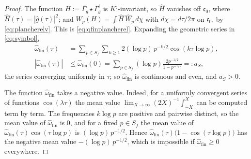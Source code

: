 \documentclass[11pt]{amsart}
\theoremstyle{definition}
\newcommand{\Knat}{K^{\natural}}
\begin{document}
\begin{proof}
The function $H:=\Gamma_g\star\Gamma_g^\dagger$ is $\Knat$-invariant, so
$\widehat H$ vanishes off $\mathfrak c_0$, where
$\widehat H(\tau)=|\widehat g(\tau)|^2$; and
$W_p(H)=\int\widehat H\,\widehat W_p\,d\chi$ with $d\chi=d\tau/2\pi$ on
$\mathfrak c_0$, by \eqref{eq:plancherelv}. This is
\eqref{eq:qfinplancherel}. Expanding the geometric series in
\eqref{eq:symbol},
\begin{equation}\label{eq:AS}
\begin{aligned}
  \widehat\omega_{\mathrm{fin}}(\tau)&=\sum_{p\in S_f}\sum_{k\ge1}
    2(\log p)\,p^{-k/2}\cos(k\tau\log p),\\
  |\widehat\omega_{\mathrm{fin}}(\tau)|&\le\widehat\omega_{\mathrm{fin}}(0)
   =\sum_{p\in S_f}(\log p)\frac{2p^{-1/2}}{1-p^{-1/2}}=:a_S ,
\end{aligned}
\end{equation}
the series converging uniformly in $\tau$; so $\widehat\omega_{\mathrm{fin}}$
is continuous and even, and $a_S>0$.

The function $\widehat\omega_{\mathrm{fin}}$ takes a negative value. Indeed,
for a uniformly convergent series of functions $\cos(\lambda\tau)$ the mean
value $\lim_{X\to\infty}(2X)^{-1}\int_{-X}^X$ can be computed term by term.
The frequencies $k\log p$ are positive and pairwise distinct, so the mean
value of $\widehat\omega_{\mathrm{fin}}$ is $0$, and for a fixed $p\in S_f$
the mean value of $\widehat\omega_{\mathrm{fin}}(\tau)\cos(\tau\log p)$ is
$(\log p)\,p^{-1/2}$. Hence
$\widehat\omega_{\mathrm{fin}}(\tau)\bigl(1-\cos(\tau\log p)\bigr)$ has the
negative mean value $-(\log p)\,p^{-1/2}$, which is impossible if
$\widehat\omega_{\mathrm{fin}}\ge0$ everywhere.


\end{proof}
\end{document}
